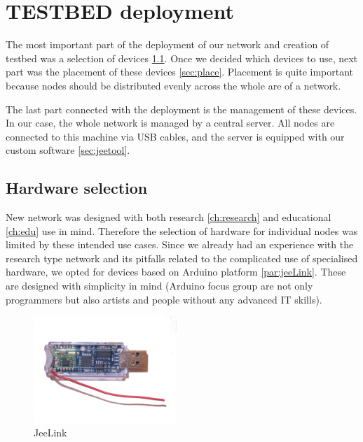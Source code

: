 \documentclass[
  print, %
  Table,   %
  nolof,     %
  nolot,     %
           oneside
]{fithesis3}
\begin{document}
\chapter{TESTBED deployment}\label{ch:testbed}
The most important part of the deployment of our network and creation of testbed was a selection of devices \ref{sec:hw}. Once we decided which devices to use, next part was the placement of these devices \ref{sec:place}. Placement is quite important because nodes should be distributed evenly across the whole are of a network.

The last part connected with the deployment is the management of these devices. In our case, the whole network is managed by a central server. All nodes are connected to this machine via USB cables, and the server is equipped with our custom software \ref{sec:jeetool}.

\section{Hardware selection}\label{sec:hw}
New network was designed with both research \ref{ch:research} and educational \ref{ch:edu} use in mind. Therefore the selection of hardware for individual nodes was limited by these intended use cases. Since we already had an experience with the research type network \cite{Matyas2015} and its pitfalls related to the complicated use of specialised hardware, we opted for devices based on Arduino platform \ref{par:jeeLink}. These are designed with simplicity in mind (Arduino focus group are not only programmers but also artists and people without any advanced IT skills).

\begin{figure}
  \vspace{-20pt}
  \begin{center}
    \includegraphics[width=0.48\textwidth]{../images/jeelink.png}
  \end{center}
  \caption{JeeLink}
  \label{fig:jeelink}
\end{figure}
\end{document}
